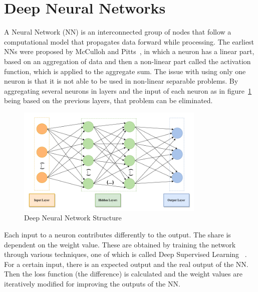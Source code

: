 \section{Deep Neural Networks}
\label{section:cnn}



A Neural Network (NN) is an interconnected group of nodes that follow a
computational model that propagates data forward while processing. The earliest
NNs were proposed by McCulloh and Pitts~\cite{neuron:model}, in which a neuron
has a linear part, based on an aggregation of data and then a non-linear part
called the activation function, which is applied to the aggregate sum. The issue
with using only one neuron is that it is not able to be used in non-linear
separable problems. By aggregating several neurons in layers and the input of
each neuron as in figure~\ref{MLP} being based on the previous layers, that
problem can be eliminated.

\begin{figure}[!htbp]
    \centering
    \includegraphics[width=0.8\textwidth]{Figures/mlp.png}
    \caption{Deep Neural Network Structure}
    \label{MLP}
\end{figure} 

Each input to a neuron contributes differently to the output. The share is
dependent on the weight value. These are obtained by training the network
through various techniques, one of which is called Deep Supervised
Learning~\cite{deeplearning} . For a certain input, there is an expected output
and the real output of the NN. Then the loss function (the difference) is
calculated and the weight values are iteratively modified for improving the
outputs of the NN.


